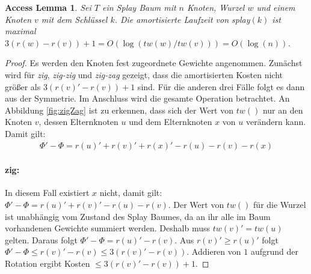 \documentclass[a4paper,12pt]{article}
\begin{document}
\newtheorem{Lemma1}{Access Lemma}[section] \label{lemmaSplay}
\begin{Lemma1}Sei $T$ ein Splay Baum mit $n$ Knoten, Wurzel $w$ und einem Knoten $v$ mit dem Schlüssel $k$. Die amortisierte Laufzeit von \textit{splay}$\left(k\right)$ ist maximal $3 \left(r\left(w\right) - r\left(v\right)\right) + 1 = O\left(\log\left(\mathit{tw}\left(w\right) / \mathit{tw}\left(v\right)\right) \right) = O\left(\log\left(n\right)\right)$. \\
	
\end{Lemma1}
\begin{proof}
	Es werden den Knoten fest zugeordnete Gewichte angenommen. Zunächst wird für \textit{zig}, \textit{zig-zig} und \textit{zig-zag} gezeigt, dass die amortisierten Kosten nicht größer als $3 \left(r\left(v\right)' - r\left(v\right)\right) + 1$ sind. Für die anderen drei Fälle folgt es dann aus der Symmetrie. Im Anschluss wird die gesamte Operation  betrachtet. An Abbildung  \ref{fig:zigZag} ist zu erkennen, dass sich der Wert von $\mathit{tw}\left(\right)$ nur an den Knoten $v$, dessen Elternknoten $u$  und dem Elternknoten $x$ von $u$ verändern kann.  Damit gilt:
	\begin{align*}
	\Phi' - \Phi  = r\left(u\right)' +r\left(v\right)' +r\left(x\right)' - r\left(u\right)- r\left(v\right)- r\left(x\right)
	\end{align*}
	
	
	\paragraph{zig:} 
	In diesem Fall existiert $x$ nicht, damit gilt:\\  {$ \Phi' - \Phi  = r\left(u\right)' +r\left(v\right)' - r\left(u\right)- r\left(v\right)$}. Der Wert von $\mathit{tw}\left(\right)$ für die Wurzel ist unabhängig vom Zustand des Splay Baumes, da an ihr alle im Baum vorhandenen Gewichte summiert werden. Deshalb muss  $\mathit{tw}\left(v\right)' =  \mathit{tw}\left(u\right)$ gelten. Daraus folgt $ \Phi' - \Phi  = r\left(u\right)'- r\left(v\right)$. Aus $r\left(v\right)' \geq r\left(u\right)'$ folgt \\ $ \Phi' - \Phi \leq  r\left(v\right)'- r\left(v\right) \leq 3\left(r\left(v\right)'- r\left(v\right)\right) $. Addieren von $1$ aufgrund der Rotation ergibt Kosten $\leq 3\left(r\left(v\right)'- r\left(v\right)\right) + 1$.

\end{proof}
\end{document}
